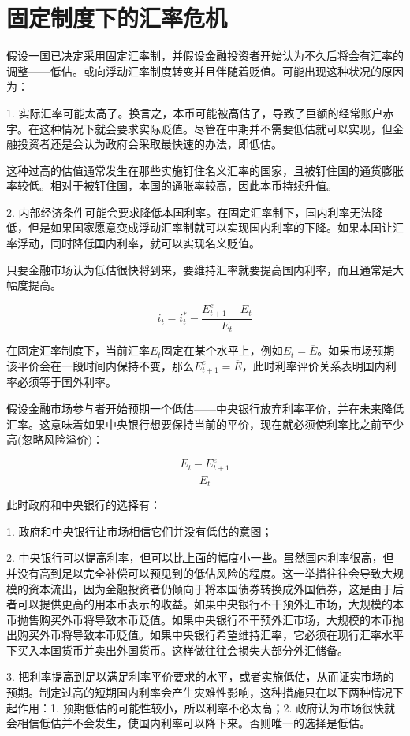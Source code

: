 \documentclass{article}
\begin{document}
\section{固定制度下的汇率危机}

假设一国已决定采用固定汇率制，并假设金融投资者开始认为不久后将会有汇率的调整——低估。或向浮动汇率制度转变并且伴随着贬值。可能出现这种状况的原因为：

1. 实际汇率可能太高了。换言之，本币可能被高估了，导致了巨额的经常账户赤字。在这种情况下就会要求实际贬值。尽管在中期并不需要低估就可以实现，但金融投资者还是会认为政府会采取最快速的办法，即低估。

这种过高的估值通常发生在那些实施钉住名义汇率的国家，且被钉住国的通货膨胀率较低。相对于被钉住国，本国的通胀率较高，因此本币持续升值。


2. 内部经济条件可能会要求降低本国利率。在固定汇率制下，国内利率无法降低，但是如果国家愿意变成浮动汇率制就可以实现国内利率的下降。如果本国让汇率浮动，同时降低国内利率，就可以实现名义贬值。

只要金融市场认为低估很快将到来，要维持汇率就要提高国内利率，而且通常是大幅度提高。

\[
i_t=i_t^*-\frac{E^e_{t+1}-E_t}{E_t}
\]


在固定汇率制度下，当前汇率$ E_t $固定在某个水平上，例如$ E_t=\overline{E} $。如果市场预期该平价会在一段时间内保持不变，那么$ E^e_{t+1}=\overline{E} $，此时利率评价关系表明国内利率必须等于国外利率。

假设金融市场参与者开始预期一个低估——中央银行放弃利率平价，并在未来降低汇率。这意味着如果中央银行想要保持当前的平价，现在就必须使利率比之前至少高(忽略风险溢价)：

\[
\frac{E_t-E^e_{t+1}}{E_t}
\]

此时政府和中央银行的选择有：

1. 政府和中央银行让市场相信它们并没有低估的意图；

2. 中央银行可以提高利率，但可以比上面的幅度小一些。虽然国内利率很高，但并没有高到足以完全补偿可以预见到的低估风险的程度。这一举措往往会导致大规模的资本流出，因为金融投资者仍倾向于将本国债券转换成外国债券，这是由于后者可以提供更高的用本币表示的收益。如果中央银行不干预外汇市场，大规模的本币抛售购买外币将导致本币贬值。如果中央银行不干预外汇市场，大规模的本币抛出购买外币将导致本币贬值。如果中央银行希望维持汇率，它必须在现行汇率水平下买入本国货币并卖出外国货币。这样做往往会损失大部分外汇储备。

3. 把利率提高到足以满足利率平价要求的水平，或者实施低估，从而证实市场的预期。制定过高的短期国内利率会产生灾难性影响，这种措施只在以下两种情况下起作用：1. 预期低估的可能性较小，所以利率不必太高；2. 政府认为市场很快就会相信低估并不会发生，使国内利率可以降下来。否则唯一的选择是低估。
\end{document}

